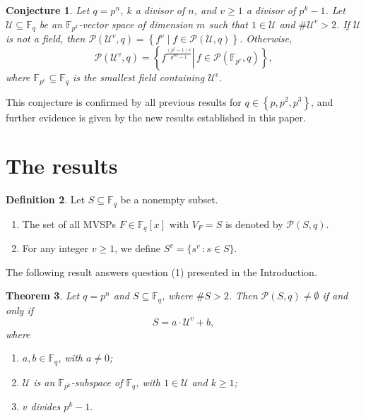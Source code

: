 \documentclass[11pt]{amsart}
\newcommand{\F}{\mathbb{F}}
\newcommand{\pp}{\mathcal P}
\newtheorem{theorem}{Theorem}[section]
\newtheorem{conjecture}[theorem]{Conjecture}
\theoremstyle{definition}
\newtheorem{definition}[theorem]{Definition}
\theoremstyle{remark}
\begin{document}
\begin{conjecture}\label{conj}
Let $q=p^n$, $k$ a divisor of $n$, and $v\geq 1$ a divisor of $p^k-1$.
Let $\mathcal{U} \subseteq \mathbb{F}_q$ be an $\mathbb{F}_{p^k}$-vector space of dimension $m$ such that $1 \in \mathcal{U}$ and
$\# \mathcal{U}^v>2$. If $\mathcal{U}$ is not a field, then $\mathcal{P}\left(\mathcal{U}^v, q\right)=\left\{f^v \mid f \in \mathcal{P}(\mathcal{U}, q)\right\}$. Otherwise,
$$
\mathcal{P}\left(\mathcal{U}^v, q\right)=\left\{\left.f^{\frac{\left(p^e-1\right) v}{p^{m k}-1}} \right\rvert\, f \in \mathcal{P}\left(\mathbb{F}_{p^e}, q\right)\right\},
$$
where $\mathbb{F}_{p^e}  \subseteq \F_q$ is the smallest field containing $\mathcal{U}^v$.
\end{conjecture}

This conjecture is confirmed by all previous results for $q \in\left\{p, p^2, p^3\right\}$, and further evidence is given by the new results established in this paper.



\section{The results}


\begin{definition}
Let $S\subseteq \F_{q}$ be a nonempty subset.
\begin{enumerate}[\rm(i)]
\item  The set of all MVSPs $F\in \F_q[x]$ with $V_F=S$ is denoted by $\pp(S, q)$.
\item For any integer $v\geq 1$, we define $ S^v=\{s^v\, : s \in  S \}$.
\end{enumerate}
\end{definition}

The following result answers question (1) presented in the Introduction.

\begin{theorem}\label{thm:main1}
Let $q = p^n$ and $S \subseteq \mathbb{F}_q$, where $\#S > 2$. Then $\pp(S, q)\ne \emptyset$ if and only if 
$$S = a \cdot \mathcal{U}^v + b,$$
where
\begin{enumerate}[\rm(i)]
\item  $a, b \in \mathbb{F}_q$, with $a \neq 0$;
\item $\mathcal{U}$ is an $\mathbb{F}_{p^k}$-subspace of $\mathbb{F}_q$, with $1 \in \mathcal{U}$ and $k\geq1$;
\item  $v$ divides $p^k-1. $
\end{enumerate}
\end{theorem}
\end{document}
